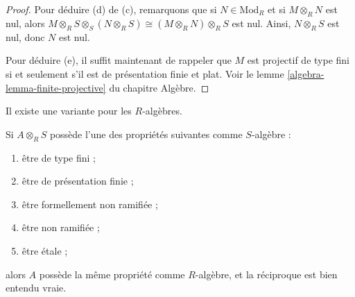 \begin{proof}
\medskip\noindent
Pour déduire (d) de (c), remarquons que si $N \in \text{Mod}_R$
et si $M \otimes_R N$ est nul, alors
$M \otimes_R S \otimes_S (N \otimes_R S) \cong (M \otimes_R N) \otimes_R 
S$ est nul. Ainsi, $N \otimes_R S$ est nul, donc $N$ est nul.

\medskip\noindent
Pour déduire (e), il suffit maintenant de rappeler que $M$
est projectif de type fini si et seulement s'il est de présentation finie
et plat. Voir le lemme \ref{algebra-lemma-finite-projective}
du chapitre Algèbre.
\end{proof}

\noindent
Il existe une variante pour les $R$-algèbres.

\begin{theorem}
\label{theorem-descend-algebra-properties}
Si $A \otimes_R S$ possède l'une des propriétés suivantes comme $S$-algèbre :
\begin{enumerate}
\item[(a)]
être de type fini ;
\item[(b)]
être de présentation finie ;
\item[(c)]
être formellement non ramifiée ;
\item[(d)]
être non ramifiée ;
\item[(e)]
être \'etale ;
\end{enumerate}
alors $A$ possède la même propriété comme $R$-algèbre,
et la réciproque est bien entendu vraie.
\end{theorem}

